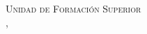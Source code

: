 \begin{titlepage}
\begin{center}
\textsc{Unidad de Formación Superior} \\
\vspace*{2cm}
\large \mes, \anio\\
\vspace*{1cm}


\end{center}
\end{titlepage} 
%
%




